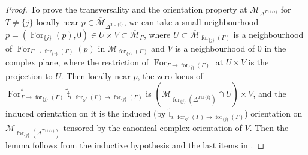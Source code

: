 \documentclass[11pt]{amsart}
\theoremstyle{definition}
\theoremstyle{remark}
\renewcommand{\for}{\operatorname{for}}
\newcommand{\For}{\operatorname{For}}
\newcommand{\<}{\left<}
\renewcommand{\>}{\right>}
\numberwithin{equation}{section}
\def\Mbar{{\overline{\mathcal M}}}
\begin{document}
\begin{proof}
To prove the transversality and the orientation property at $\Mbar_{\Delta^{{T\sqcup\{i\}}}}$ for %
$T\ne \{j\}$ locally %
near $p\in \Mbar_{\Delta^{{T\sqcup\{i\}}}}$, we can take a small neighbourhood $p=(\For_{\{j\}}(p),0)\in U\times V \subset \Mbar_{\Gamma}$, where $U\subset \Mbar_{\for_{\{j\}}(\Gamma)}$ is a neighbourhood of $\For_{\Gamma \to \for_{\{j\}}(\Gamma)}(p)$ in $ \Mbar_{\for_{\{j\}}(\Gamma)}$ and $V$ is a neighbourhood of 0 in the complex plane, where the restriction of $\For_{\Gamma \to \for_{\{j\}}(\Gamma)}$ at $U\times V$ is the projection to $U$. Then locally near $p$, the zero locus of $\For_{\Gamma\to \for_{\{j\}}(\Gamma)}^* \tilde{\mathfrak t}_{i,\for_{S^I}(\Gamma)\to \for_{\{j\}}(\Gamma)}$ is $(\mathcal M_{\for_{\{j\}}(\Delta^{T\sqcup\{i\}})}\cap U)\times V$, and the induced orientation on it is the %
induced (by $\tilde{\mathfrak t}_{i,\for_{S^I}(\Gamma)\to\for_{\{j\}}(\Gamma)}$) orientation on %
$\mathcal M_{\for_{\{j\}}(\Delta^{T\sqcup\{i\}})}$ tensored by the canonical complex orientation of $V$. %
Then the lemma follows %
from the %
inductive hypothesis and the last items in \cite[Proposition 3.1 and Proposition 3.3]{TZ1}.

\end{proof}
\end{document}
